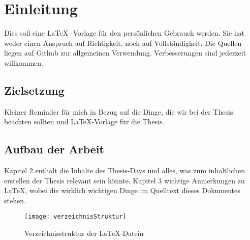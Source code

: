 \section{Einleitung}
Dies soll eine \LaTeX{} -Vorlage für den persönlichen Gebrauch werden. Sie hat weder einen Anspruch auf Richtigkeit,
noch auf Vollständigkeit. Die Quellen liegen auf Github zur allgemeinen Verwendung. Verbesserungen sind jederzeit willkommen.

\subsection{Zielsetzung}
Kleiner Reminder für mich in Bezug auf die Dinge, die wir bei der Thesis beachten sollten und \LaTeX{}-Vorlage für die Thesis.

\subsection{Aufbau der Arbeit}
Kapitel 2 enthält die Inhalte des Thesis-Days und alles, was zum inhaltlichen erstellen der Thesis relevant sein könnte.
Kapitel 3 wichtige Anmerkungen zu \LaTeX{}, wobei die wirklich wichtigen Dinge im Quelltext dieses Dokumentes stehen.

\begin{figure}[htbp]
    \begin{center}
        \raggedright\caption{Verzeichnisstruktur der \LaTeX-Datein}
        \texttt{[image: verzeichnisStruktur]}
        \captionsetup{width=1.0\textwidth}
        \label{figur-k1}
    \end{center}
\end{figure}
